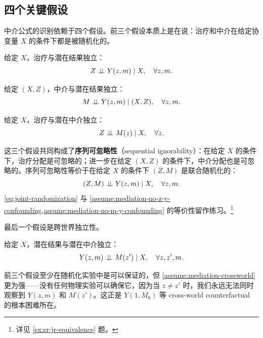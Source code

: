 \subsection{四个关键假设}

中介公式的识别依赖于四个假设。前三个假设本质上是在说：治疗和中介在给定协变量 $X$ 的条件下都是被随机化的。

\begin{assumption}\label{assume:mediation-no-z-y-confounding}
给定 $X$，治疗与潜在结果独立：
\[
Z \mathrel{\perp\!\!\!\perp} Y(z, m) \mid X, \quad \forall z, m.
\]
\end{assumption}

\begin{assumption}\label{assume:mediation-no-m-y-confounding}
给定 $(X, Z)$，中介与潜在结果独立：
\[
M \mathrel{\perp\!\!\!\perp} Y(z, m) \mid (X, Z), \quad \forall z, m.
\]
\end{assumption}

\begin{assumption}\label{assume:mediation-no-z-m-confounding}
给定 $X$，治疗与潜在中介独立：
\[
Z \mathrel{\perp\!\!\!\perp} M(z) \mid X, \quad \forall z.
\]
\end{assumption}

这三个假设共同构成了\textbf{序列可忽略性}（sequential ignorability）：在给定 $X$ 的条件下，治疗分配是可忽略的；进一步在给定 $(X, Z)$ 的条件下，中介分配也是可忽略的。序列可忽略性等价于在给定 $X$ 的条件下 $(Z, M)$ 是联合随机化的：
\begin{equation}
(Z, M) \mathrel{\perp\!\!\!\perp} Y(z, m) \mid X, \quad \forall z, m.
\label{eq:joint-randomization}
\end{equation}
\cref{eq:joint-randomization} 与 \cref{assume:mediation-no-z-y-confounding,assume:mediation-no-m-y-confounding} 的等价性留作练习。\footnote{详见 \cref{ex:sr-jr-equivalence} 题。}

最后一个假设是跨世界独立性。

\begin{assumption}[跨世界独立性]\label{assume:mediation-crossworld}
给定 $X$，潜在结果与潜在中介独立：
\[
Y(z, m) \mathrel{\perp\!\!\!\perp} M(z') \mid X, \quad \forall z, z', m.
\]
\end{assumption}

前三个假设至少在随机化实验中是可以保证的，但 \cref{assume:mediation-crossworld} 更为强——没有任何物理实验可以确保它，因为当 $z \neq z'$ 时，我们永远无法同时观察到 $Y(z, m)$ 和 $M(z')$。这正是 $Y(1, M_0)$ 等 cross-world counterfactual 的根本困难所在。

